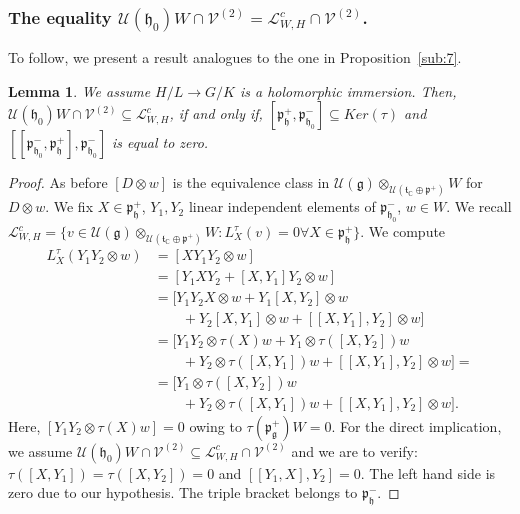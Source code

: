 \documentclass[12pt]{amsart}
\newtheorem{lem}[thm]{Lemma}
\theoremstyle{definition}
\theoremstyle{remark}
\newcommand{\g}{\mathfrak{g}}
\newcommand{\h}{\mathfrak{h}}
\newcommand{\p}{\mathfrak p}
\renewcommand{\t}{{\mathfrak t}}
\newcommand{\C}{{\mathbb C}}
\numberwithin{equation}{section}
\begin{document}
  \subsubsection{The equality  $\mathcal U(\h_0)W \cap \mathcal V^{(2)}
   =\mathcal L_{W,H}^c\cap \mathcal V^{(2)}$. } To follow, we present a result analogues
    to the one in  Proposition~\ref{sub:7}.

   \begin{lem} We assume $H/L\rightarrow G/K$ is a holomorphic immersion. Then,
   $\mathcal U(\h_0)W \cap \mathcal V^{(2)}\subseteq \mathcal L_{W,H}^c$, if and only if, $[\p_\h^+, \p_{\h_0}^-] \subseteq Ker(\tau)$ and
$[[\p_{\h_0}^-, \p_\h^+],\p_{\h_0}^- ]$
 is equal to zero.



\end{lem}
\begin{proof} As before $[D\otimes w]$ is the equivalence class in
$\mathcal U(\g) \otimes_{\mathcal U(\t_\C \oplus \p^+)}   W $ for $D\otimes w$. We fix
$ X\in \p_\h^+$, $ Y_1 , Y_2$ linear independent elements of $\p_{\h_0}^- $, $w \in W$. We recall
$\mathcal L_{W,H}^c=\{v \in \mathcal U(\g) \otimes_{\mathcal U(\t_\C \oplus \p^+)}   W : L_X^\tau (v)=0
 \forall X \in \p_\h^+  \} $.
  We compute
\begin{equation*} \begin{split} L_X^\tau(Y_1Y_2\otimes w)& =[XY_1Y_2 \otimes w] \\ & = [Y_1XY_2 + [X,Y_1]Y_2 \otimes w ]
\\ & = [ Y_1Y_2X\otimes w + Y_1[X,Y_2]\otimes w \\ & \quad \quad +Y_2[X,Y_1]\otimes w
+[[X,Y_1],Y_2] \otimes w ]
\\ & = [Y_1Y_2\otimes \tau(X)w + Y_1 \otimes \tau([X,Y_2])w \\ & \quad \quad + Y_2\otimes  \tau([X,Y_1])w +
[[X,Y_1],Y_2] \otimes w]=\\ & = [ Y_1 \otimes \tau([X,Y_2])w \\ & \quad \quad + Y_2\otimes  \tau([X,Y_1])w +
[[X,Y_1],Y_2] \otimes w]. \end{split}
\end{equation*}
Here, $[Y_1Y_2\otimes \tau(X)w]=0$ owing to $\tau(\p_\g^+
) W=0$.
For the direct implication, we assume $\mathcal U(\h_0)W \cap \mathcal V^{(2)}
   \subseteq \mathcal L_{W,H}^c\cap \mathcal V^{(2)}$ and we are to verify: $\tau([X,Y_1])= \tau([X,Y_2])=0$ and $ [[Y_1,X],Y_2]=0$.
The left hand side is zero due to our hypothesis.   The triple bracket belongs to $\p_\h^-$.

\end{proof}
\end{document}
